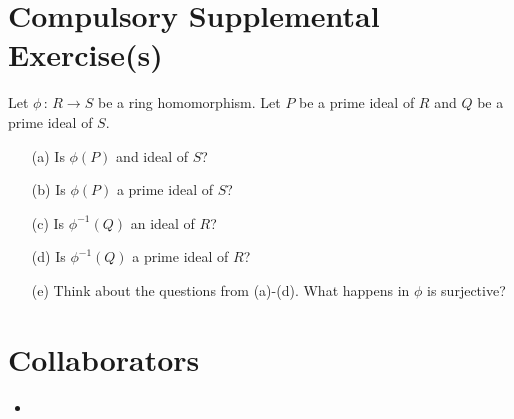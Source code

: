 \documentclass[10pt]{article}
\begin{document}
\section*{Compulsory Supplemental Exercise(s)}

\begin{problem}[title=Problem 3]
    \par Let \(\phi\,:\,R\to S\) be a ring homomorphism. Let \(P\) be a prime ideal of \(R\) and \(Q\) be a prime ideal of \(S\).
    \begin{itemize}
        \item[(a)] Is \(\phi(P)\) and ideal of \(S\)?
        \item[(b)] Is \(\phi(P)\) a prime ideal of \(S\)?
        \item[(c)] Is \(\phi^{-1}(Q)\) an ideal of \(R\)?
        \item[(d)] Is \(\phi^{-1}(Q)\) a prime ideal of \(R\)?
        \item[(e)] Think about the questions from (a)-(d). What happens in \(\phi\) is surjective?
    \end{itemize}
\end{problem}

\appendix

\section{Collaborators}

\begin{itemize}
    \item 
\end{itemize}
    
\end{document}
